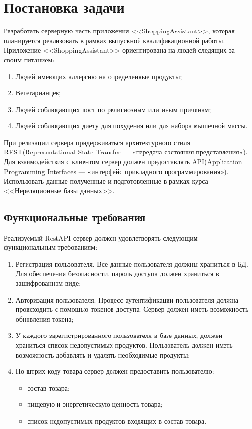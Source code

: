 \section{Постановка задачи}


Разработать серверную часть приложения <<ShoppingAssistant>>, которая планируется реализовать в рамках выпускной квалификационной работы.
Приложение <<ShoppingAssistant>> ориентирована на людей следящих за
своим питанием:
\begin{enumerate}
	\item Людей имеющих аллергию на определенные продукты;
	\item Вегетарианцев;
	\item Людей соблюдающих пост по религиозным или иным причинам;
	\item Людей соблюдающих диету для похудения или для набора мышечной
	массы.
\end{enumerate}


При релизации сервера придерживаться архитектурного стиля REST(Representational State Transfer — «передача состояния представления»). Для взаимодействия с клиентом сервер должен предоставлять API(Application Programming Interfaces  — «интерфейс прикладного программирования»). Использовать данные полученные и подготовленные в рамках курса <<Нереляционные базы данных>>.


\subsection{Функциональные требования}
Реализуемый RestAPI сервер должен удовлетворять следующим функциональным требованиям:
\begin{enumerate}
	\item Регистрация пользователя. Все данные пользователя должны храниться в БД. Для обеспечения безопасности, пароль доступа должен храниться в зашифрованном виде;
	\item Авторизация пользователя. Процесс аутентификации пользователя должна происходить с помощью токенов доступа. Сервер должен иметь возможность обновления токена;
	\item У каждого зарегистрированного пользователя в базе данных, должен храниться список недопустимых продуктов. Пользователь должен иметь возможность добавлять и удалять необходимые продукты;
	\item По штрих-коду товара сервер должен предоставить пользователю:
	 \begin{itemize}
	 	\item состав товара;
	 	\item пищевую и энергетическую ценность товара;
	 	\item список недопустимых продуктов входящих в состав товара. 
	\end{itemize}
\end{enumerate}

